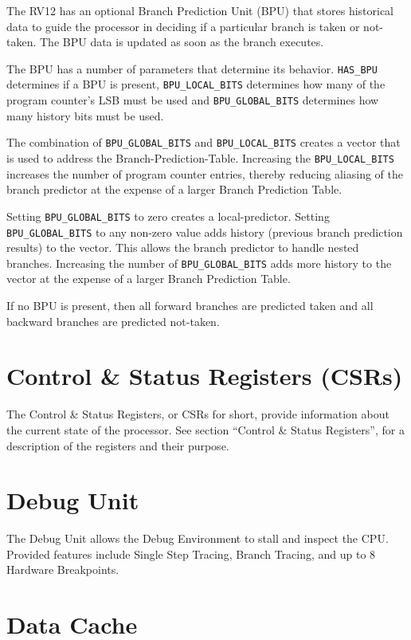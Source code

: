 The RV12 has an optional Branch Prediction Unit (BPU) that stores historical
data to guide the processor in deciding if a particular branch is taken or not-
taken.  The BPU data is updated as soon as the branch executes.

The BPU has a number of parameters that determine its behavior.
\texttt{HAS\_BPU} determines if a BPU is present, \texttt{BPU\_LOCAL\_BITS}
determines how many of the program counter's LSB must be used and
\texttt{BPU\_GLOBAL\_BITS}  determines how many history bits must be used.

The combination of \texttt{BPU\_GLOBAL\_BITS} and \texttt{BPU\_LOCAL\_BITS}
creates a vector that is used to address the Branch-Prediction-Table. Increasing
the \texttt{BPU\_LOCAL\_BITS} increases the number of program counter entries,
thereby reducing aliasing of the branch predictor at the expense of a larger
Branch Prediction Table.

Setting \texttt{BPU\_GLOBAL\_BITS} to zero creates a local-predictor. Setting
\texttt{BPU\_GLOBAL\_BITS} to any non-zero value adds history (previous branch
prediction results) to the vector. This allows the branch predictor to handle
nested branches. Increasing the number of \texttt{BPU\_GLOBAL\_BITS} adds more
history to the vector at the expense of a larger Branch Prediction Table.

If no BPU is present, then all forward branches are predicted taken and
all backward branches are predicted not-taken.

\section{Control \& Status Registers (CSRs)} \label{control-status-registers-csrs}

The Control \& Status Registers, or CSRs for short, provide information
about the current state of the processor. See section ``Control \&
Status Registers'', for a description of the registers and their
purpose.

\section{Debug Unit} \label{debug-unit-1}

The Debug Unit allows the Debug Environment to stall and inspect the
CPU. Provided features include Single Step Tracing, Branch Tracing, and
up to 8 Hardware Breakpoints.

\section{Data Cache} \label{data-cache}

